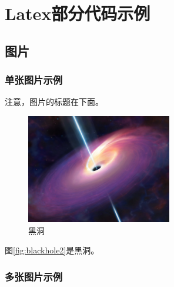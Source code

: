 \chapter{Latex部分代码示例}\thispagestyle{main}

\section{图片}

\subsection{单张图片示例}

\par 注意，图片的标题在下面。

\begin{figure}[!ht]
    \centering
    \includegraphics[width=2.5in]{images/blackhole.jpeg}
    \caption{黑洞}
    \label{fig:blackhole}
\end{figure}
图\ref{fig:blackhole2}是黑洞。

\subsection{多张图片示例}

